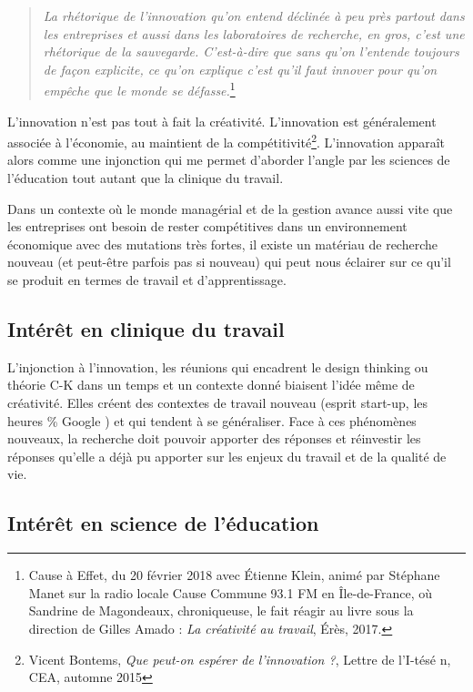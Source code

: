 \documentclass{article}
\begin{document}
\begin{quote}
\textit{La rhétorique de l'innovation qu'on entend déclinée à peu près partout dans les entreprises et aussi dans les laboratoires de recherche, en gros, c'est une rhétorique de la sauvegarde. C'est-à-dire que sans qu'on l'entende toujours de façon explicite, ce qu'on explique c'est qu'il faut innover pour qu'on empêche que le monde se défasse.}\footnote{Cause à Effet, du 20 février 2018 avec Étienne Klein, animé par Stéphane Manet sur la radio locale Cause Commune 93.1 FM en Île-de-France, où Sandrine de Magondeaux, chroniqueuse, le fait réagir au livre sous la direction de Gilles Amado : \emph{La créativité au travail}, Érès, 2017.}
\end{quote} 

L'innovation n'est pas tout à fait la créativité. L'innovation est généralement associée à l'économie, au maintient de la compétitivité\footnote{Vicent Bontems, \textit{Que peut-on espérer de l'innovation ?}, Lettre de l'I-tésé n, CEA, automne 2015}. L'innovation apparaît alors comme une injonction qui me permet d'aborder l'angle par les sciences de l'éducation tout autant que la clinique du travail.

Dans un contexte où le monde managérial et de la gestion avance aussi vite que les entreprises ont besoin de rester compétitives dans un environnement économique avec des mutations très fortes, il existe un matériau de recherche nouveau (et peut-être parfois pas si nouveau) qui peut nous éclairer sur ce qu'il se produit en termes de travail et d'apprentissage.

\subsection{Intérêt en clinique du travail}


L'injonction à l'innovation, les réunions qui encadrent le \og design thinking \fg{} ou \og théorie C-K \fg{} dans un temps et un contexte donné biaisent l'idée même de créativité.
Elles créent des contextes de travail nouveau (esprit start-up, les heures \% Google \fg{}) et qui tendent à se généraliser. 
Face à ces phénomènes nouveaux, la recherche doit pouvoir apporter des réponses et réinvestir les réponses qu'elle a déjà pu apporter sur les enjeux du travail et de la qualité de vie.

\subsection{Intérêt en science de l'éducation}
\end{document}
